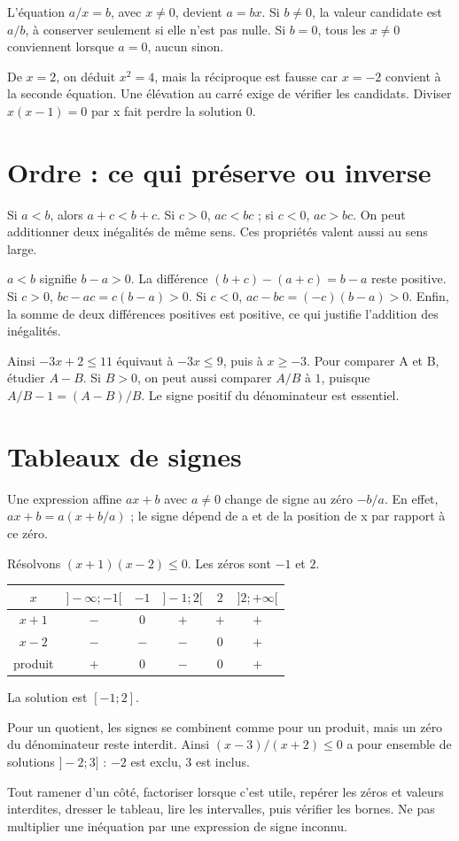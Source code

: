 \documentclass[../cours_2de.tex]{subfiles}
\begin{document}
L'équation $a/x=b$, avec $x\ne0$, devient $a=bx$. Si $b\ne0$, la valeur candidate est $a/b$, à conserver seulement si elle n'est pas nulle. Si $b=0$, tous les $x\ne0$ conviennent lorsque $a=0$, aucun sinon.
\begin{attention}
De $x=2$, on déduit $x^2=4$, mais la réciproque est fausse car $x=-2$ convient à la seconde équation. Une élévation au carré exige de vérifier les candidats. Diviser $x(x-1)=0$ par x fait perdre la solution $0$.
\end{attention}
\section{Ordre : ce qui préserve ou inverse}
\begin{propriete}
Si $a<b$, alors $a+c<b+c$. Si $c>0$, $ac<bc$ ; si $c<0$, $ac>bc$. On peut additionner deux inégalités de même sens. Ces propriétés valent aussi au sens large.
\end{propriete}
\begin{demonstration}
$a<b$ signifie $b-a>0$. La différence $(b+c)-(a+c)=b-a$ reste positive. Si $c>0$, $bc-ac=c(b-a)>0$. Si $c<0$, $ac-bc=(-c)(b-a)>0$. Enfin, la somme de deux différences positives est positive, ce qui justifie l'addition des inégalités.
\end{demonstration}
Ainsi $-3x+2\le11$ équivaut à $-3x\le9$, puis à $x\ge-3$.
Pour comparer A et B, étudier $A-B$. Si $B>0$, on peut aussi comparer $A/B$ à $1$, puisque $A/B-1=(A-B)/B$. Le signe positif du dénominateur est essentiel.
\section{Tableaux de signes}
Une expression affine $ax+b$ avec $a\ne0$ change de signe au zéro $-b/a$. En effet, $ax+b=a(x+b/a)$ ; le signe dépend de a et de la position de x par rapport à ce zéro.
\begin{exemple}
Résolvons $(x+1)(x-2)\le0$. Les zéros sont $-1$ et $2$.
\begin{center}\begin{tabular}{c|ccccc}
$x$ & $]-\infty;-1[$ & $-1$ & $]-1;2[$ & $2$ & $]2;+\infty[$\\\hline
$x+1$ & $-$ & $0$ & $+$ & $+$ & $+$\\
$x-2$ & $-$ & $-$ & $-$ & $0$ & $+$\\
produit & $+$ & $0$ & $-$ & $0$ & $+$\\
\end{tabular}\end{center}
La solution est $[-1;2]$.
\end{exemple}
Pour un quotient, les signes se combinent comme pour un produit, mais un zéro du dénominateur reste interdit. Ainsi $(x-3)/(x+2)\le0$ a pour ensemble de solutions $]-2;3]$ : $-2$ est exclu, $3$ est inclus.
\begin{methode}
Tout ramener d'un côté, factoriser lorsque c'est utile, repérer les zéros et valeurs interdites, dresser le tableau, lire les intervalles, puis vérifier les bornes. Ne pas multiplier une inéquation par une expression de signe inconnu.
\end{methode}
\end{document}
